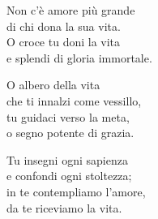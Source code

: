 

\spazio

\strofa Non c'è amore più grande\\
di chi dona la sua vita.\\
O croce tu doni la vita\\
e splendi di gloria immortale.

\spazio


\spazio

\strofa O albero della vita\\
che ti innalzi come vessillo,\\
tu guidaci verso la meta,\\
o segno potente di grazia.

\spazio


\spazio

\strofa Tu insegni ogni sapienza\\
e confondi ogni stoltezza;\\
in te contempliamo l'amore,\\
da te riceviamo la vita.

\spazio

